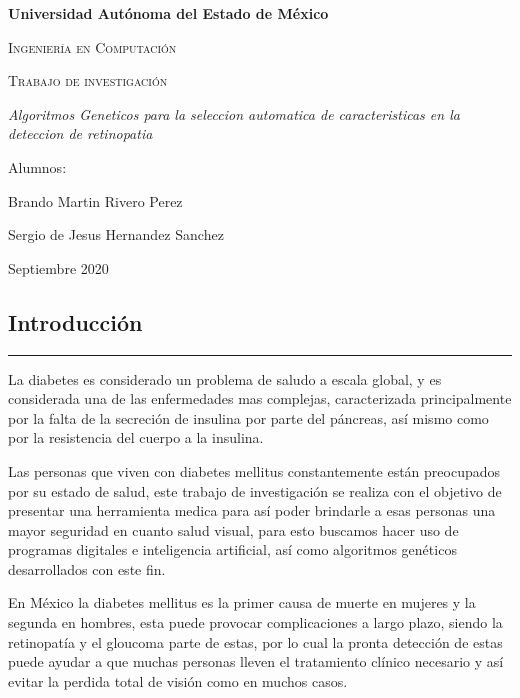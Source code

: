 \documentclass[12pt,letterpaper]{article}
\author{Sergio de Jesús Hernández Sánchez; Brando Martín Rivero Pérez}
\begin{document}
	\begin{titlepage}
		\pagestyle{empty}
		\centering
		{\bfseries\LARGE Universidad Autónoma del Estado de México \par}
		\vspace{1cm}
		{\scshape\Large Ingeniería en Computación \par}
		\vspace{3cm}
		{\scshape\Huge Trabajo de investigación\par}
		\vspace{3cm}
		{\itshape\Large Algoritmos Geneticos para la seleccion automatica de caracteristicas en la deteccion de retinopatia  \par}
		\vfill
		{\Large Alumnos: \par}
		{\Large Brando Martin Rivero Perez\par}
		{\Large Sergio de Jesus Hernandez Sanchez}
		\vfill
		{\Large Septiembre 2020 \par}
	\end{titlepage}
	\newpage
	\pagestyle{empty}
	\tableofcontents
	\listoffigures
	\listoftables
	\newpage
	\setcounter{page}{1}
	\pagestyle{plain}
	
\begin{center}
\section{Introducción}
\hrule
\end{center}
\bigskip

La diabetes es considerado un problema de saludo a escala global, y es considerada una de las enfermedades mas complejas, caracterizada principalmente por la falta de la secreción de  insulina por parte del páncreas, así mismo como por la resistencia del cuerpo a la insulina.


Las personas que viven con diabetes mellitus constantemente están preocupados por su estado de salud, este trabajo de investigación se realiza con el objetivo de presentar una herramienta medica para así poder brindarle a esas personas una mayor seguridad en cuanto salud visual, para esto buscamos hacer uso de programas digitales e inteligencia artificial, así como algoritmos genéticos desarrollados con este fin.

En México la diabetes mellitus es la primer causa de muerte en mujeres y la segunda en hombres, esta puede provocar complicaciones a largo plazo, siendo la retinopatía y el gloucoma parte de estas, por lo cual la pronta detección de estas puede ayudar a que muchas personas lleven el tratamiento clínico necesario y así evitar la perdida total de visión como en muchos casos.
\end{document}
